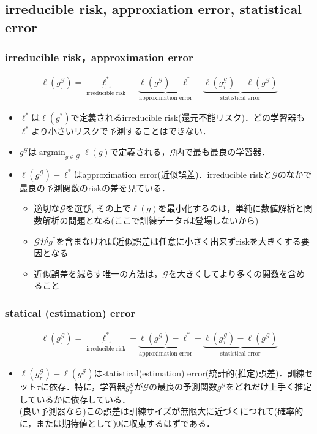 \documentclass[dvipdfmx,cjk]{beamer}
\theoremstyle{example}
\DeclareMathOperator{\argmin}{argmin}
\begin{document}
\subsection{irreducible risk, approxiation error, statistical error}
\begin{frame}
    \frametitle{irreducible risk，approximation error}
    \begin{align*}
        \ell(g^\mathcal{G}_\tau)=\underbrace{\ell^*}_\text{irreducible risk}+\underbrace{\ell(g^\mathcal{G})-\ell^*}_\text{approximation error}+\underbrace{\ell(g^\mathcal{G}_\tau)-\ell(g^\mathcal{G})}_\text{statistical error}\tag{2.16}
    \end{align*}
    \begin{itemize}
        \item \alert{$\ell^*$}は$\ell(g^*)$で定義されるirreducible risk(還元不能リスク)．どの学習器も$\ell^*$より小さいリスクで予測することはできない．
        \item \alert{$g^\mathcal{G}$}は$\argmin_{g\in\mathcal{G}}\ell(g)$で定義される，$\mathcal{G}$内で最も最良の学習器．
        \item \alert{$\ell(g^\mathcal{G})-\ell^*$}はapproximation error(近似誤差)．irreducible riskと$\mathcal{G}$のなかで最良の予測関数のriskの差を見ている．
              \begin{itemize}
                  \item 適切な$\mathcal{G}$を選び, その上で$\ell(g)$を最小化するのは，単純に数値解析と関数解析の問題となる(ここで訓練データ$\tau$は登場しないから)
                  \item $\mathcal{G}$が$g^*$を含まなければ近似誤差は任意に小さく出来ずriskを大きくする要因となる
                  \item 近似誤差を減らす唯一の方法は，$\mathcal{G}$を大きくしてより多くの関数を含めること
              \end{itemize}
    \end{itemize}
\end{frame}
\begin{frame}
    \frametitle{statical (estimation) error}
    \begin{align*}
        \ell(g^\mathcal{G}_\tau)=\underbrace{\ell^*}_\text{irreducible risk}+\underbrace{\ell(g^\mathcal{G})-\ell^*}_\text{approximation error}+\underbrace{\ell(g^\mathcal{G}_\tau)-\ell(g^\mathcal{G})}_\text{statistical error}\tag{2.16}
    \end{align*}
    \begin{itemize}
        \item \alert{$\ell(g^\mathcal{G}_\tau)-\ell(g^\mathcal{G})$}はstatistical(estimation) error(統計的(推定)誤差)．訓練セット$\tau$に依存．特に，学習器$g^\mathcal{G}_\tau$が$\mathcal{G}$の最良の予測関数$g^\mathcal{G}$をどれだけ上手く推定しているかに依存している．\\(良い予測器なら)この誤差は訓練サイズが無限大に近づくにつれて(確率的に，または期待値として)0に収束するはずである．
    \end{itemize}
\end{frame}
\end{document}
